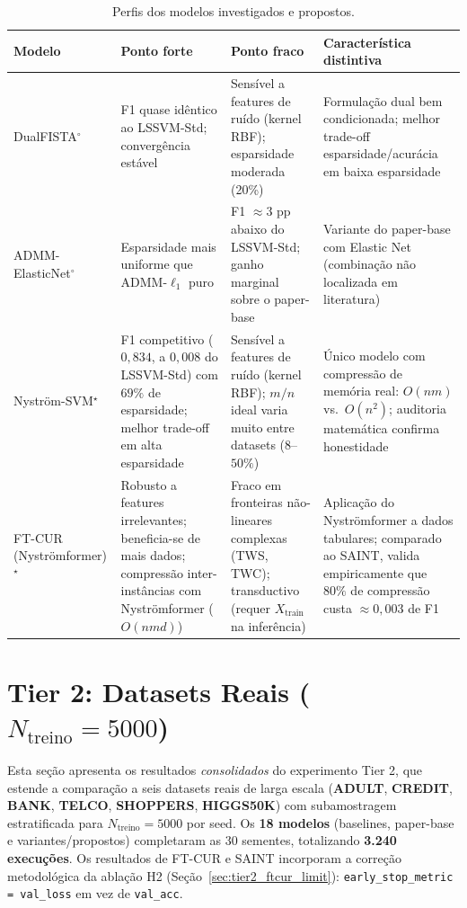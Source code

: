 \documentclass[12pt,a4paper]{article}
\begin{document}
\begin{table}[H]
\centering
\caption{Perfis dos modelos investigados e propostos.}
\label{tab:profiles}
\begin{tabular}{lp{3.0cm}p{3.0cm}p{3.5cm}}
\toprule
\textbf{Modelo} & \textbf{Ponto forte} & \textbf{Ponto fraco} & \textbf{Característica distintiva} \\
\midrule
DualFISTA$^\circ$
  & F1 quase idêntico ao LSSVM-Std; convergência estável
  & Sensível a features de ruído (kernel RBF); esparsidade moderada (20\%)
  & Formulação dual bem condicionada; melhor trade-off esparsidade/acurácia em baixa esparsidade \\
\addlinespace
ADMM-ElasticNet$^\circ$
  & Esparsidade mais uniforme que ADMM-$\ell_1$ puro
  & F1 $\approx 3$ pp abaixo do LSSVM-Std; ganho marginal sobre o paper-base
  & Variante do paper-base com Elastic Net (combinação não localizada em literatura) \\
\addlinespace
Nyström-SVM$^\star$
  & F1 competitivo ($0{,}834$, a $0{,}008$ do LSSVM-Std) com $69\%$ de esparsidade;
    melhor trade-off em alta esparsidade
  & Sensível a features de ruído (kernel RBF); $m/n$ ideal varia muito entre datasets ($8$--$50\%$)
  & Único modelo com compressão de memória real: $O(nm)$ vs.\ $O(n^2)$; auditoria matemática confirma honestidade \\
\addlinespace
FT-CUR (Nyströmformer)$^\star$
  & Robusto a features irrelevantes; beneficia-se de mais dados; compressão
    inter-instâncias com Nyströmformer ($O(nmd)$)
  & Fraco em fronteiras não-lineares complexas (TWS, TWC); transductivo
    (requer $X_\text{train}$ na inferência)
  & Aplicação do Nyströmformer a dados tabulares; comparado ao SAINT, valida
    empiricamente que $80\%$ de compressão custa $\approx 0{,}003$ de F1 \\
\bottomrule
\end{tabular}
\end{table}

\section{Tier 2: Datasets Reais ($N_{\text{treino}}=5000$)}
\label{sec:tier2}

Esta seção apresenta os resultados \emph{consolidados} do experimento Tier 2,
que estende a comparação a seis datasets reais de larga escala
(\textbf{ADULT}, \textbf{CREDIT}, \textbf{BANK}, \textbf{TELCO},
\textbf{SHOPPERS}, \textbf{HIGGS50K}) com subamostragem estratificada para
$N_{\text{treino}}=5000$ por seed. Os \textbf{18 modelos} (baselines, paper-base
e variantes/propostos) completaram as 30 sementes, totalizando
\textbf{3.240 execuções}. Os resultados de FT-CUR e SAINT incorporam a correção
metodológica da ablação H2 (Seção~\ref{sec:tier2_ftcur_limit}):
\texttt{early\_stop\_metric = val\_loss} em vez de \texttt{val\_acc}.
\end{document}
